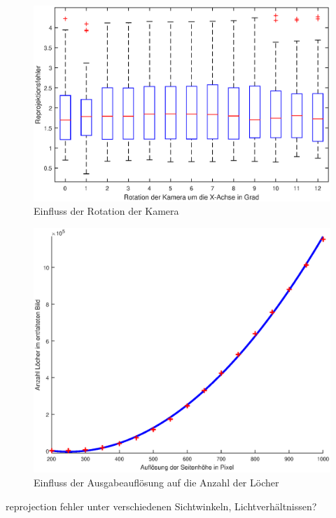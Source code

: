\begin{figure}[!htb]
	\centering
	\includegraphics[width=\textwidth]{images/reprojectionErrorDeg.eps}
	\caption{Einfluss der Rotation der Kamera}
	\label{fig:influenceRot}
\end{figure}

\begin{figure}[!htb]
	\centering
	\includegraphics[width=\textwidth]{images/numberOfHoles.eps}
	\caption{Einfluss der Ausgabeauflösung auf die Anzahl der Löcher}
	\label{fig:influenceRes}
\end{figure}


reprojection fehler unter verschiedenen Sichtwinkeln, Lichtverhältnissen?



